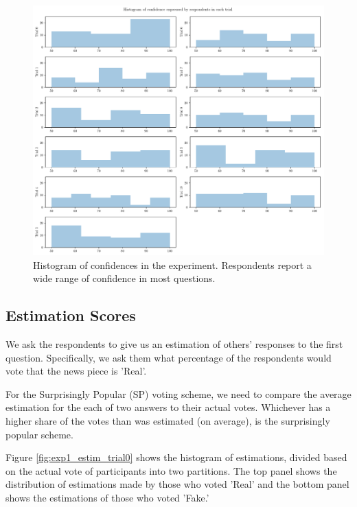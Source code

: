 \documentclass{report}
\theoremstyle{definition}
\begin{document}
\newpage
\begin{center}
\hspace*{-3cm}
\begin{minipage}{1.5\linewidth}
\begin{figure}[H]
\captionsetup{singlelinecheck = false, justification=justified}
    \centering
    \includegraphics[width=\textwidth, center]{exp1_conf.pdf}
    \caption{Histogram of confidences in the experiment. Respondents report a wide range of confidence in most questions.}
    \label{fig:conf_hist}
\end{figure}
\end{minipage}
\end{center}


\newpage
\vspace*{-10mm}
\subsection{Estimation Scores}
We ask the respondents to give us an estimation of others' responses to the first question. Specifically, we ask them what percentage of the respondents would vote that the news piece is 'Real'.

For the Surprisingly Popular (SP) voting scheme, we need to compare the average estimation for the each of two answers to their actual votes. Whichever has a higher share of the votes than was estimated (on average), is the surprisingly popular scheme.

Figure \ref{fig:exp1_estim_trial0} shows the histogram  of estimations, divided based on the actual vote of participants into two partitions. The top panel shows the distribution of estimations made by those who voted 'Real' and the bottom panel shows the estimations of those who voted 'Fake.'
\end{document}
